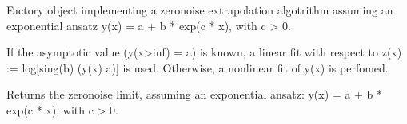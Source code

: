 \documentclass[letterpaper,10pt,english]{sphinxmanual}
\begin{document}
\begin{fulllineitems}
\label{\detokenize{index:mitiq.factories.ExpFactory}}
Factory object implementing a zero\sphinxhyphen{}noise extrapolation algotrithm assuming an
exponential ansatz y(x) = a + b * exp(\sphinxhyphen{}c * x), with c \textgreater{} 0.

If the asymptotic value (y(x\sphinxhyphen{}\textgreater{}inf) = a) is known, a linear fit with respect
to z(x) := log{[}sing(b) (y(x) \sphinxhyphen{} a){]} is used.
Otherwise, a non\sphinxhyphen{}linear fit of y(x) is perfomed.

\begin{fulllineitems}
\label{\detokenize{index:mitiq.factories.ExpFactory.reduce}}
Returns the zero\sphinxhyphen{}noise limit, assuming an exponential ansatz:
y(x) = a + b * exp(\sphinxhyphen{}c * x), with c \textgreater{} 0.

\end{fulllineitems}


\end{fulllineitems}

\end{document}
